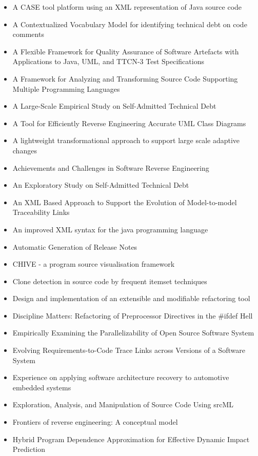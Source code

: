 \begin{itemize}
\item A CASE tool platform using an XML representation of Java source code
\item A Contextualized Vocabulary Model for identifying technical debt on code comments
\item A Flexible Framework for Quality Assurance of Software Artefacts with Applications to Java, UML, and TTCN-3 Test Specifications
\item A Framework for Analyzing and Transforming Source Code Supporting Multiple Programming Languages
\item A Large-Scale Empirical Study on Self-Admitted Technical Debt
\item A Tool for Efficiently Reverse Engineering Accurate UML Class Diagrams
\item A lightweight transformational approach to support large scale adaptive changes
\item Achievements and Challenges in Software Reverse Engineering
\item An Exploratory Study on Self-Admitted Technical Debt
\item An XML Based Approach to Support the Evolution of Model-to-model Traceability Links
\item An improved XML syntax for the java programming language
\item Automatic Generation of Release Notes
\item CHIVE - a program source visualisation framework
\item Clone detection in source code by frequent itemset techniques
\item Design and implementation of an extensible and modifiable refactoring tool
\item Discipline Matters: Refactoring of Preprocessor Directives in the \#ifdef Hell
\item Empirically Examining the Parallelizability of Open Source Software System
\item Evolving Requirements-to-Code Trace Links across Versions of a Software System
\item Experience on applying software architecture recovery to automotive embedded systems
\item Exploration, Analysis, and Manipulation of Source Code Using srcML
\item Frontiers of reverse engineering: A conceptual model
\item Hybrid Program Dependence Approximation for Effective Dynamic Impact Prediction

\end{itemize}
